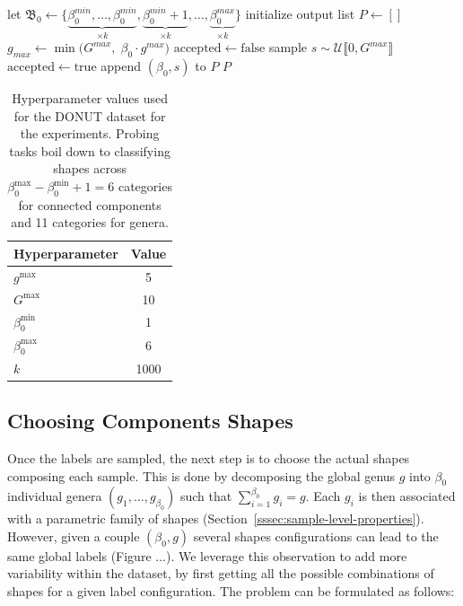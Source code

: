\begin{algorithm}
  \caption{Sampling $(\beta_0, g)$ \\ 
  \textbf{Input:} $g^{\max},\; G^{\max},\; \beta_0^{\min},\; \beta_0^{\max},\; k$} \label{alg:topogen-labels-sampling}

  \begin{algorithmic}[ ] %
    \State let $\mathfrak{B}_0 \gets \{\underbrace{\beta_0^{min}, \dots, \beta_0^{min}}_{\times k}, \underbrace{\beta_0^{min}+1}_{\times k}, \dots, \underbrace{\beta_0^{max}}_{\times k}\}$
    \State initialize output list $P \gets []$
      \State $g_{max} \gets \min\big(G^{max},\; \beta_0 \cdot g^{max}\big)$
      \State $\mathrm{accepted} \gets \mathrm{false}$
        \State sample $s \sim \mathcal{U}\llbracket 0, G^{max} \rrbracket$
          \State $\mathrm{accepted} \gets \mathrm{true}$
        \EndIf
      \EndWhile
      \State append $(\beta_0, s)$ to $P$
    \EndFor
    \Statex
    \Return $P$
  \end{algorithmic} 
\end{algorithm}

\begin{table}
\centering
\label{tab:topogen-hyperparams}
\begin{tabular}{l c}
\toprule
\textbf{Hyperparameter} & \textbf{Value} \\
\midrule
$g^{\max}$ & 5 \\
$G^{\max}$ & 10 \\
$\beta_0^{\min}$ & 1 \\
$\beta_0^{\max}$ & 6 \\
$k$ & 1000 \\
\bottomrule
\end{tabular}
\caption{Hyperparameter values used for the DONUT dataset for the experiments. Probing tasks boil down to classifying shapes across $\beta_0^{\max} - \beta_0^{\min} + 1 = 6$ categories for connected components and 11 categories for genera.}
\end{table}

\subsection{Choosing Components Shapes}
\label{ssec:suppl_choosing_components}

Once the labels are sampled, the next step is to choose the actual shapes composing each sample. This is done by decomposing the global genus $g$ into $\beta_0$ individual genera $(g_1, \dots, g_{\beta_0})$ such that $\sum_{i=1}^{\beta_0} g_i = g$. Each $g_i$ is then associated with a parametric family of shapes (Section~\ref{sssec:sample-level-properties}). However, given a couple $(\beta_0, g)$ several shapes configurations can lead to the same global labels (Figure ...). We leverage this observation to add more variability within the dataset, by first getting all the possible combinations of shapes for a given label configuration. The problem can be formulated as follows:

